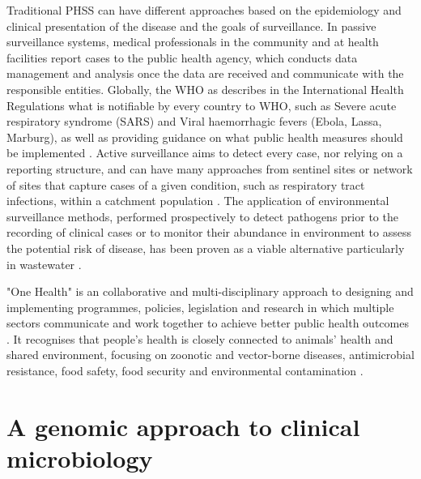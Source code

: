 Traditional PHSS can have different approaches based on the epidemiology and clinical presentation of the disease and the goals of surveillance. In passive surveillance systems, medical professionals in the community and at health facilities report cases to the public health agency, which conducts data management and analysis once the data are received and communicate with the responsible entities. Globally, the WHO as describes in the International Health Regulations what is notifiable by every country to WHO, such as Severe acute respiratory syndrome (SARS) and Viral haemorrhagic fevers
(Ebola, Lassa, Marburg), as well as providing guidance on what public health measures should be implemented \citep{world_health_organization_international_2005}. Active surveillance aims to detect every case, nor relying on a reporting structure, and can have many approaches from sentinel sites or network of sites that capture cases of a given condition, such as respiratory tract infections, within a catchment population \citep{murray_infectious_2017, melo-cristino_estudo_2006}. The application of environmental surveillance methods, performed prospectively to detect pathogens prior to the recording of clinical cases or to monitor their abundance in environment to assess the potential risk of disease, has been proven as a viable alternative particularly in wastewater \citep{andrews_environmental_2020, mcweeney_demonstration_1894, baker_combined_2011, larsen_tracking_2020}.  

"One Health" is an collaborative and multi-disciplinary approach to designing and implementing programmes, policies, legislation and research in which multiple sectors communicate and work together to achieve better public health outcomes \citep{mackenzie_one_2019}. It recognises that people’s health is closely connected to animals’ health and shared environment, focusing on zoonotic and vector-borne diseases, antimicrobial resistance, food safety, food security and environmental contamination \citep{rugarabamu_one-health_2021}.


\section{A genomic approach to clinical microbiology}

